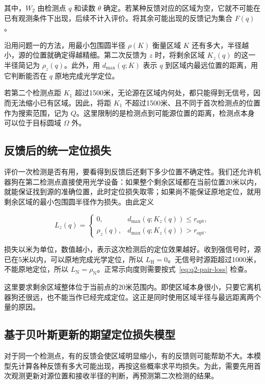 \documentclass[UTF8,a4paper,zihao=-4,fontset=none]{ctexart}
\begin{document}
其中，\(W_2\) 由检测点 \(q\) 和读数 \(\theta\) 确定。若某种反馈对应的区域为空，它就不可能在已有观测条件下出现，后续不计入评价。将其余可能出现的反馈记为集合 \(F(q)\)。

沿用问题一的方法，用最小包围圆半径 \(\rho(K)\) 衡量区域 \(K\) 还有多大，半径越小，源的位置就确定得越精细。第二次反馈为 \(z\) 时，将剩余区域 \(K_z(q)\) 的这一半径简记为 \(\rho_z(q)\)。此外，用 \(d_{\max}(q;K)\) 表示 \(q\) 到区域内最远位置的距离，用它判断能否在 \(q\) 原地完成光学定位。

若第二个检测点距 \(K_1\) 超过1500米，无论源在区域内何处，都只能得到无信号，因而无法缩小已有区域。因此，将距 \(K_1\) 不超过1500米、且不同于首次检测点的位置作为搜索范围，记为 \(Q\)。这里限制的是检测点到可能源位置的距离，检测点本身可以位于目标圆域 \(\Omega\) 外。

\subsection{反馈后的统一定位损失}

评价一次检测是否有用，要看得到反馈后还剩下多少位置不确定性。我们还允许机器狗在第二检测点直接使用光学设备：如果整个剩余区域都在当前位置20米以内，就能保证找到源的准确位置，此时定位损失取零；如果尚不能保证原地定位，就用剩余区域的最小包围圆半径作为损失。由此定义

\begin{equation}
 L_z(q)=
 \begin{cases}
 0,&d_{\max}(q;K_z(q))\le r_{\mathrm{opt}},\\
 \rho_z(q),&d_{\max}(q;K_z(q))>r_{\mathrm{opt}}.
 \end{cases}
\label{eq:q2-pair-loss}
\end{equation}

损失以米为单位，数值越小，表示这次检测后的定位效果越好。收到强信号时，源已在5米以内，可以原地完成光学定位，所以 \(L_{\mathrm H}=0\)。无信号时源距超过1000米，不能原地定位，所以 \(L_{\mathrm N}=\rho_{\mathrm N}\)。正常示向度则需要按式~\eqref{eq:q2-pair-loss} 检查。

这里要求剩余区域整体位于当前点的20米范围内。即使区域本身很小，只要它离机器狗还很远，也不能当作已经完成定位。这正是同时使用区域半径与最远距离两个量的原因。

\subsection{基于贝叶斯更新的期望定位损失模型}

对于同一个检测点，有的反馈会使区域明显缩小，有的反馈则可能帮助不大。本模型先计算各种反馈有多大可能出现，再按这些概率求平均损失。为此，需要先用首次观测更新对源位置和接收半径的判断，再预测第二次检测的结果。
\end{document}

